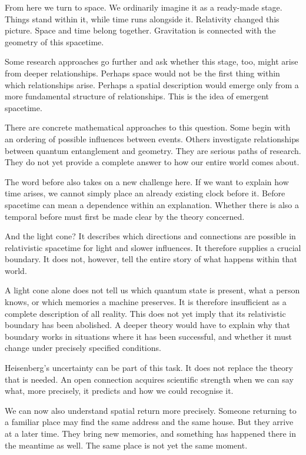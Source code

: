 From here we turn to space. We ordinarily imagine it as a ready-made stage. Things stand within it, while time runs alongside it. Relativity changed this picture. Space and time belong together. Gravitation is connected with the geometry of this spacetime.

Some research approaches go further and ask whether this stage, too, might arise from deeper relationships. Perhaps space would not be the first thing within which relationships arise. Perhaps a spatial description would emerge only from a more fundamental structure of relationships. This is the idea of emergent spacetime.

There are concrete mathematical approaches to this question. Some begin with an ordering of possible influences between events. Others investigate relationships between quantum entanglement and geometry. They are serious paths of research. They do not yet provide a complete answer to how our entire world comes about.

The word before also takes on a new challenge here. If we want to explain how time arises, we cannot simply place an already existing clock before it. Before spacetime can mean a dependence within an explanation. Whether there is also a temporal before must first be made clear by the theory concerned.

And the light cone? It describes which directions and connections are possible in relativistic spacetime for light and slower influences. It therefore supplies a crucial boundary. It does not, however, tell the entire story of what happens within that world.

A light cone alone does not tell us which quantum state is present, what a person knows, or which memories a machine preserves. It is therefore insufficient as a complete description of all reality. This does not yet imply that its relativistic boundary has been abolished. A deeper theory would have to explain why that boundary works in situations where it has been successful, and whether it must change under precisely specified conditions.

Heisenberg's uncertainty can be part of this task. It does not replace the theory that is needed. An open connection acquires scientific strength when we can say what, more precisely, it predicts and how we could recognise it.

We can now also understand spatial return more precisely. Someone returning to a familiar place may find the same address and the same house. But they arrive at a later time. They bring new memories, and something has happened there in the meantime as well. The same place is not yet the same moment.

